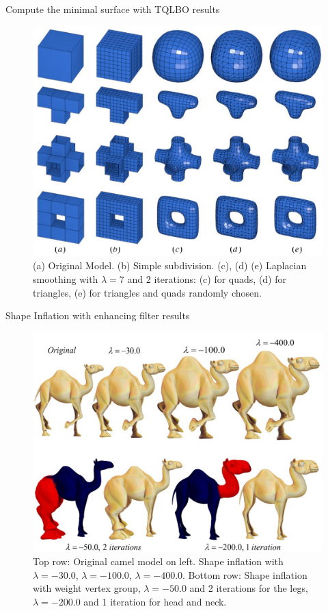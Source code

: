 \documentclass[10pt, compress, english]{beamer}
\begin{document}
\begin{frame}{Compute the minimal surface with TQLBO results}


\begin{figure}
\includegraphics[height=0.6\paperheight]{img/test_triangles_quads}

\protect\caption{(a) Original Model. (b) Simple subdivision. (c), (d) (e) Laplacian
smoothing with $\lambda=7$ and 2 iterations: (c) for quads, (d) for
triangles, (e) for triangles and quads randomly chosen.}


\end{figure}


\end{frame}

\begin{frame}{Shape Inflation with enhancing filter results}


\begin{figure}
\includegraphics[height=0.5\textwidth]{img/camello_enhanced2}

\protect\caption{Top row: Original camel model on left. Shape inflation with $\lambda=-30.0$,
$\lambda=-100.0$, $\lambda=-400.0$. Bottom row: Shape inflation
with weight vertex group, $\lambda=-50.0$ and 2 iterations for the
legs, $\lambda=-200.0$ and 1 iteration for head and neck.}


\end{figure}


\end{frame}
\end{document}
